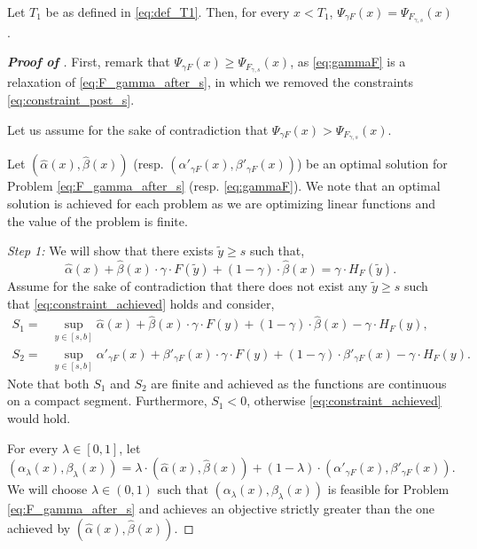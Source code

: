 \begin{lemma}
\label{lem:relaxing_Psi_F_s}
Let $T_1$ be as defined in \eqref{eq:def_T1}. Then, for every $x < T_1$, $\Psi_{\gamma F}(x) = \Psi_{F_{\gamma,s}}(x)$.   
\end{lemma}

\begin{proof}[\textbf{Proof of }]
First, remark that $\Psi_{\gamma F}(x) \geq \Psi_{F_{\gamma,s}}(x)$, as \eqref{eq:gammaF} is a relaxation of \eqref{eq:F_gamma_after_s}, in which we removed the constraints \eqref{eq:constraint_post_s}.

Let us assume for the sake of contradiction that $\Psi_{\gamma F}(x) > \Psi_{F_{\gamma,s}}(x)$. 

Let $(\hat{\alpha}(x),\hat{\beta}(x))$ (resp. $(\alpha'_{\gamma F}(x),\beta'_{\gamma F}(x))$) be an optimal solution for Problem \eqref{eq:F_gamma_after_s} (resp.  \eqref{eq:gammaF}). We note that an optimal solution is achieved for each problem as we are optimizing linear functions and the value of the problem is finite.

\textit{Step 1:} We will show that there exists $\tilde{y} \geq s$ such that,
\begin{equation}
\label{eq:constraint_achieved}
    \hat{\alpha}(x) + \hat{\beta}(x) \cdot \gamma \cdot F(\tilde{y}) + (1-\gamma) \cdot  \hat{\beta}(x) = \gamma \cdot H_{F}(\tilde{y}).
\end{equation}
Assume for the sake of contradiction that there does not exist any $\tilde{y} \geq s$ such that \eqref{eq:constraint_achieved} holds and consider,
\begin{align*}
        S_1 =& \sup_{y \in [s,b]} \hat{\alpha}(x) + \hat{\beta}(x) \cdot \gamma \cdot F(y) + (1-\gamma) \cdot  \hat{\beta}(x) - \gamma \cdot H_{F}(y),\\
        S_2 =& \sup_{y \in [s,b]} \alpha'_{\gamma F}(x) + \beta'_{\gamma F}(x) \cdot \gamma \cdot F(y) + (1-\gamma) \cdot  \beta'_{\gamma F}(x) - \gamma \cdot H_{F}(y).
\end{align*}
Note that both $S_1$ and $S_2$ are finite and achieved as the functions are continuous on a compact segment. Furthermore, $S_1 < 0$, otherwise \eqref{eq:constraint_achieved} would hold.

For every $\lambda \in [0,1]$, let $(\alpha_\lambda(x),\beta_\lambda(x)) = \lambda \cdot (\hat{\alpha}(x),\hat{\beta}(x)) + (1-\lambda) \cdot (\alpha'_{\gamma F}(x),\beta'_{\gamma F}(x)).$ We will choose $\lambda \in (0,1)$ such that $(\alpha_\lambda(x),\beta_\lambda(x))$ is feasible for Problem \eqref{eq:F_gamma_after_s} and achieves an objective strictly greater than the one achieved by $(\hat{\alpha}(x),\hat{\beta}(x))$. 


\end{proof}
